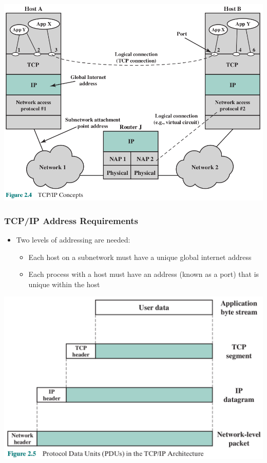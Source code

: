 \documentclass[pdflatex,compress]{beamer}
\begin{document}
\begin{frame}
	\begin{center}
		\includegraphics[height=0.9\textheight]{img/img04}
	\end{center}
\end{frame}

\begin{frame}
	\frametitle{TCP/IP Address Requirements}
	\begin{itemize}
		\item Two levels of addressing are needed:
		\begin{itemize}
			\item Each host on a subnetwork must have a unique global internet address
			\item Each process with a host must have an address (known as a port) that is unique within the host
		\end{itemize}
	\end{itemize}
\end{frame}

\begin{frame}
	\begin{center}
		\includegraphics[height=0.8\textheight]{img/img05}
	\end{center}
\end{frame}
\end{document}
